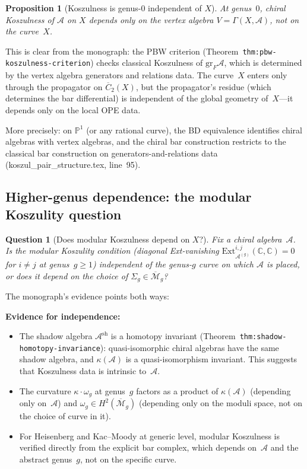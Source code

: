 \documentclass[11pt]{article}
\newcommand{\cA}{\mathcal{A}}
\newcommand{\bP}{\mathbb{P}}
\newcommand{\bC}{\mathbb{C}}
\newcommand{\Ext}{\mathrm{Ext}}
\newcommand{\gr}{\mathrm{gr}}
\theoremstyle{plain}
\newtheorem{proposition}[conjecture]{Proposition}
\newtheorem{question}[conjecture]{Question}
\theoremstyle{definition}
\theoremstyle{remark}
\begin{document}
\begin{proposition}[Koszulness is genus-0 independent of $X$]
\label{prop:genus-0-independence}
At genus~$0$, chiral Koszulness of $\cA$ on $X$ depends only on
the vertex algebra $V = \Gamma(X, \cA)$, not on the curve~$X$.
\end{proposition}

This is clear from the monograph: the PBW criterion
(Theorem~\texttt{thm:pbw-koszulness-criterion}) checks
classical Koszulness of $\gr_F\cA$, which is determined by the
vertex algebra generators and relations data.  The curve~$X$
enters only through the propagator on $\overline{C}_2(X)$, but
the propagator's residue (which determines the bar differential)
is independent of the global geometry of~$X$---it depends only
on the local OPE data.

More precisely: on $\bP^1$ (or any rational curve), the BD
equivalence identifies chiral algebras with vertex algebras, and
the chiral bar construction restricts to the classical bar
construction on generators-and-relations data
(koszul\_pair\_structure.tex, line~95).

\subsection{Higher-genus dependence: the modular Koszulity question}

\begin{question}[Does modular Koszulness depend on $X$?]
\label{q:modular-curve}
Fix a chiral algebra~$\cA$.  Is the modular Koszulity condition
(diagonal Ext-vanishing $\Ext^{i,j}_{\cA^{(g)}}(\bC,\bC) = 0$
for $i \neq j$ at genus~$g \geq 1$) independent of the genus-$g$
curve on which $\cA$ is placed, or does it depend on the choice of
$\Sigma_g \in \overline{\mathcal{M}}_g$?
\end{question}

The monograph's evidence points both ways:

\textbf{Evidence for independence:}
\begin{itemize}
\item The shadow algebra $\cA^{\mathrm{sh}}$ is a homotopy
  invariant (Theorem~\texttt{thm:shadow-homotopy-invariance}):
  quasi-isomorphic chiral algebras have the same shadow algebra,
  and $\kappa(\cA)$ is a quasi-isomorphism invariant.  This
  suggests that Koszulness data is intrinsic to~$\cA$.
\item The curvature $\kappa \cdot \omega_g$ at genus~$g$ factors
  as a product of $\kappa(\cA)$ (depending only on~$\cA$) and
  $\omega_g \in H^2(\overline{\mathcal{M}}_g)$ (depending only
  on the moduli space, not on the choice of curve in it).
\item For Heisenberg and Kac--Moody at generic level, modular
  Koszulness is verified directly from the explicit bar complex,
  which depends on~$\cA$ and the abstract genus~$g$, not on the
  specific curve.
\end{itemize}
\end{document}
